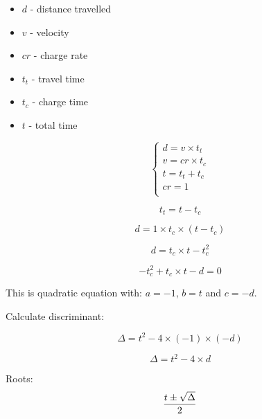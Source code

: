 \documentclass{article}
\begin{document}
\begin{itemize}
    \item $d$ - distance travelled
    \item $v$ - velocity
    \item $cr$ - charge rate
    \item $t_t$ - travel time
    \item $t_c$ - charge time
    \item $t$ - total time
\end{itemize}

\begin{displaymath}
    \begin{cases}
        d = v \times t_t \\
        v = cr \times t_c \\
        t = t_t + t_c \\
        cr = 1 \\
    \end{cases}
\end{displaymath}

\begin{displaymath}
    t_t = t - t_c
\end{displaymath}

\begin{displaymath}
    d = 1 \times t_c \times (t - t_c)
\end{displaymath}

\begin{displaymath}
    d = t_c \times t - t_c^2
\end{displaymath}

\begin{displaymath}
    - t_c^2 + t_c \times t - d = 0
\end{displaymath}

This is quadratic equation with: $a = -1$, $b = t$ and $c = -d$.

Calculate discriminant:

\begin{displaymath}
    \Delta = t^2 - 4 \times (-1) \times (-d)
\end{displaymath}

\begin{displaymath}
    \Delta = t^2 - 4 \times d
\end{displaymath}


Roots:
\begin{displaymath}
    \frac{t \pm \sqrt{\Delta}}{2}\\
\end{displaymath}
\end{document}
